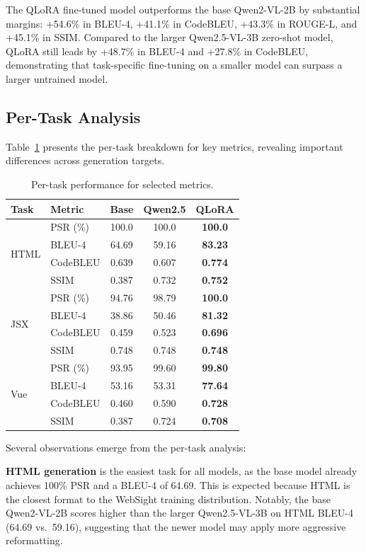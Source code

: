 The QLoRA fine-tuned model outperforms the base Qwen2-VL-2B by substantial margins: +54.6\% in BLEU-4, +41.1\% in CodeBLEU, +43.3\% in ROUGE-L, and +45.1\% in SSIM. Compared to the larger Qwen2.5-VL-3B zero-shot model, QLoRA still leads by +48.7\% in BLEU-4 and +27.8\% in CodeBLEU, demonstrating that task-specific fine-tuning on a smaller model can surpass a larger untrained model.

\subsection{Per-Task Analysis}

Table~\ref{tab:per_task} presents the per-task breakdown for key metrics, revealing important differences across generation targets.

\begin{table}[h]
\centering
\caption{Per-task performance for selected metrics.}
\label{tab:per_task}
\begin{tabular}{llccc}
\hline
\textbf{Task} & \textbf{Metric} & \textbf{Base} & \textbf{Qwen2.5} & \textbf{QLoRA} \\
\hline
\multirow{4}{*}{HTML}
 & PSR (\%) & 100.0 & 100.0 & \textbf{100.0} \\
 & BLEU-4 & 64.69 & 59.16 & \textbf{83.23} \\
 & CodeBLEU & 0.639 & 0.607 & \textbf{0.774} \\
 & SSIM & 0.387 & 0.732 & \textbf{0.752} \\
\hline
\multirow{4}{*}{JSX}
 & PSR (\%) & 94.76 & 98.79 & \textbf{100.0} \\
 & BLEU-4 & 38.86 & 50.46 & \textbf{81.32} \\
 & CodeBLEU & 0.459 & 0.523 & \textbf{0.696} \\
 & SSIM & 0.748 & 0.748 & \textbf{0.748} \\
\hline
\multirow{4}{*}{Vue}
 & PSR (\%) & 93.95 & 99.60 & \textbf{99.80} \\
 & BLEU-4 & 53.16 & 53.31 & \textbf{77.64} \\
 & CodeBLEU & 0.460 & 0.590 & \textbf{0.728} \\
 & SSIM & 0.387 & 0.724 & \textbf{0.708} \\
\hline
\end{tabular}
\end{table}

Several observations emerge from the per-task analysis:

\textbf{HTML generation} is the easiest task for all models, as the base model already achieves 100\% PSR and a BLEU-4 of 64.69. This is expected because HTML is the closest format to the WebSight training distribution. Notably, the base Qwen2-VL-2B scores higher than the larger Qwen2.5-VL-3B on HTML BLEU-4 (64.69 vs.\ 59.16), suggesting that the newer model may apply more aggressive reformatting.

